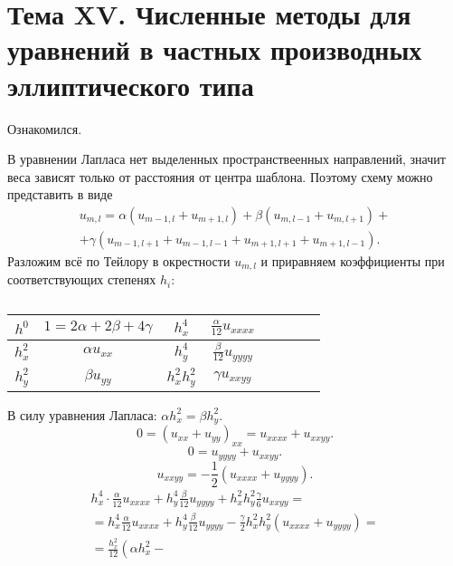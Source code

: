 \documentclass[a4paper]{article}
\begin{document}
\section*{Тема XV. Численные методы для уравнений
в частных производных эллиптического типа}
\begin{hiProb}[5.1]
\end{hiProb}
\begin{sol}
Ознакомился.
\end{sol}
\begin{hiProb}[7.1]
\end{hiProb}
\begin{sol}
В уравнении Лапласа нет выделенных пространствеенных направлений,
значит веса зависят только от расстояния от центра
шаблона. Поэтому схему можно представить в виде
\begin{multline*}
	u_{m,l}= \alpha \left( u_{m-1,l}+
	u_{m+1,l} \right) +\beta\left( u_{m,l-1}+
u_{m,l+1}\right)
+\\+\gamma \left( u_{m-1,l+1}+
u_{m-1,l-1}+ u_{m+1,l+1}+u_{m+1,l-1}\right) 
.\end{multline*} 
Разложим всё по Тейлору в окрестности  $u_{m,l}$ и 
приравняем коэффициенты при соответствующих степенях
$h_i$:
\begin{table}[htpb]
\centering
\caption{}
\label{tab:1}
\begin{tabular}{|Cc|Cc|Cc|Cc|}
	\hline $h^0$ & $1=2\alpha+2\beta+4\gamma$ & 
		     $h_x^4$& $\frac{\alpha}{12}u_{x x x x}$ \\
	\hline $h_{x}^2$ & $\alpha u_{x x}$ & 
			 $h^4_y$& $\frac{\beta}{12}
			 u_{y y y y}$ \\
	\hline $h_y^2$ & $\beta u_{y y}$ & 
		       $h_x^2 h_y^2$& 
		       $\gamma u_{x x y y}$\\
	\hline
\end{tabular}
\end{table}
В  силу уравнения Лапласа: $\alpha h_x^2=\beta h_y^2$.
\[
	0=\left( u_{x x}+ u_{yy} \right) _{x x}=
	u_{x x x x}+ u_{x x y y}
.\] 
\[
0= u_{y y y y}+ u_{xxyy}
.\] 
\[
	u_{x x y y}=-\frac{1}{2} \left( u_{x x x x }+
	u_{y y y y}\right) 
.\] 
\begin{multline*}
h_x^4 \cdot \frac{\alpha}{12} u_{x x x x}
+h_y^4 \frac{\beta}{12} u_{y yy y}+
h_x^2 h_y^2 \frac{\gamma}{6}
u_{x x y y}=\\=
h_x^4 \frac{\alpha}{12} u_{x x x x}
+h_y^4 \frac{\beta}{12}
u_{y y y y}-
\frac{\gamma}{2} h_x^2 h_y^2 \left( 
u_{x x x x}+u_{y y y y}\right) =\\=
\frac{h_x^2}{12} \left( \alpha h_x^2 -

\end{multline*}
\end{sol}
\end{document}
